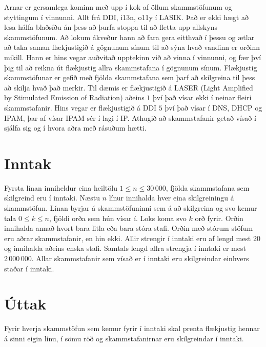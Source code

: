 
Arnar er gersamlega kominn með upp í kok af öllum skammstöfunum og styttingum í vinnunni. Allt frá DDI, i13n, o11y í LASIK.
Það er ekki hægt að lesa hálfa blaðsíðu án þess að þurfa stoppa til að fletta upp allskyns skammstöfunum. Að lokum ákveður hann
að fara gera eitthvað í þessu og ætlar að taka saman flækjustigið á gögnunum sínum til að sýna hvað vandinn er orðinn mikill.
Hann er hins vegar auðvitað upptekinn við að vinna í vinnunni, og fær því þig til að reikna út flækjustig allra skammstafana í
gögnunum sínum. Flækjustig skammstöfunar er gefið með fjölda skammstafana sem þarf að skilgreina til þess að skilja hvað það merkir.
Til dæmis er flækjustigið á LASER (Light Amplified by Stimulated Emission of Radiation) aðeins $1$ því það vísar ekki í neinar fleiri
skammstafanir. Hins vegar er flækjustigið á DDI $5$ því það vísar í DNS, DHCP og IPAM, þar af vísar IPAM sér í lagi í IP.
Athugið að skammstafanir getað vísað í sjálfa sig og í hvora aðra með rásuðum hætti.

\section*{Inntak}
Fyrsta línan inniheldur eina heiltölu $1 \leq n \leq 30 \, 000$, fjölda skammstafana sem skilgreind eru í inntaki.
Næstu $n$ línur innihalda hver eina skilgreiningu á skammstöfun. Línan byrjar á skammstöfuninni sem á að skilgreina og svo kemur
tala $0 \leq k \leq n$, fjöldi orða sem hún vísar í. Loks koma svo $k$ orð fyrir. Orðin innihalda annað hvort bara litla eða bara stóra
stafi. Orðin með stórum stöfum eru aðrar skammstafanir, en hin ekki.
Allir strengir í inntaki eru af lengd mest $20$ og innihalda aðeins enska stafi. Samtals lengd allra strengja í inntaki er
mest $2 \, 000 \, 000$.
Allar skammstafanir sem vísað er í inntaki eru skilgreindar einhvers staðar í inntaki.

\section*{Úttak}
Fyrir hverja skammstöfun sem kemur fyrir í inntaki skal prenta flækjustig hennar á sinni eigin línu, í sömu röð og
skammstafanirnar eru skilgreindar í inntaki.

